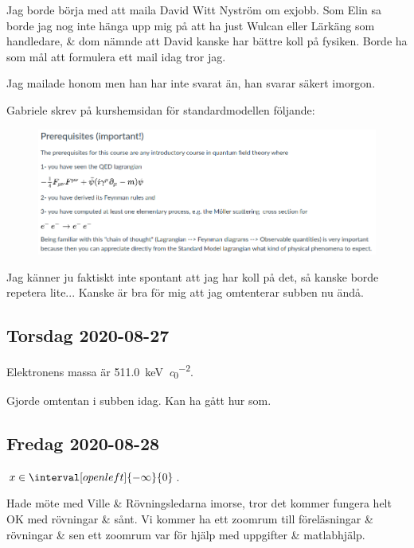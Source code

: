 Jag borde börja med att maila David Witt Nyström om exjobb. Som Elin sa borde jag nog inte hänga upp mig på att ha just Wulcan eller Lärkäng som handledare, \& dom nämnde att David kanske har bättre koll på fysiken. Borde ha som mål att formulera ett mail idag tror jag.

Jag mailade honom men han har inte svarat än, han svarar säkert imorgon.

\bigskip

Gabriele skrev på kurshemsidan för standardmodellen följande:
\begin{figure}[H]
    \centering
    \includegraphics[width=1.0\textwidth]{pics/standard_model_prerequisites.png}
\end{figure}
Jag känner ju faktiskt inte spontant att jag har koll på det, så kanske borde repetera lite... Kanske är bra för mig att jag omtenterar subben nu ändå.


\subsection*{Torsdag 2020-08-27}

Elektronens massa är \SI{511.0}{\kilo \electronvolt\per \clight^2}.

Gjorde omtentan i subben idag. Kan ha gått hur som.


\subsection*{Fredag 2020-08-28}

$x \in \interval[open left]{-\infty}{0}$.

Hade möte med Ville \& Rövningsledarna imorse, tror det kommer fungera helt OK med rövningar \& sånt. Vi kommer ha ett zoomrum till föreläsningar \& rövningar \& sen ett zoomrum var för hjälp med uppgifter \& matlabhjälp.

